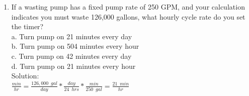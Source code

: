 \documentclass{article}
\begin{document}
\begin{enumerate}
 (Ans: \$356/month)


Correct Answer(s): 

\item If a wasting pump has a fixed pump rate of 250 GPM, and your calculation
indicates you must waste 126,000 gallons, what hourly cycle rate do you set
the timer?\\
a. Turn pump on 21 minutes every day\\
b. Turn pump on 504 minutes every hour\\
c. Turn pump on 42 minutes every day\\
d. Turn pump on 21 minutes every hour\\

\vspace{0.3cm}
Solution:\\
\vspace{0.2cm}
$\frac{min}{hr}=\frac{126,000 \enspace gal}{day}*\frac{day}{24 \enspace hrs}*\frac{min}{250 \enspace gal}=\boxed{\frac{21 \enspace min}{hr}}$

\end{enumerate}
\end{document}
